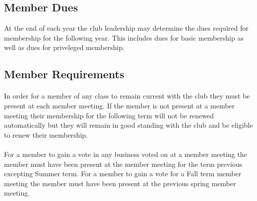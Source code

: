 \documentclass[12pt]{article}
\begin{document}




%
%
\subsection{Member Dues}
At the end of each year the club leadership may determine the dues required for membership for the following year.
This includes dues for basic membership as well as dues for priveleged membership.



\subsection{Member Requirements}
\paragraph{}
In order for a member of any class to remain current with the club they must be present at each member
meeting. If the member is not present at a member meeting their membership for the following term 
will not be renewed automatically but they will remain in good standing with the club and be 
eligible to renew their membership.

\paragraph{}
For a member to gain a vote in any business voted on at a member meeting the member must have been 
present at the member meeting for the term previous excepting Summer term. For a member to gain a 
vote for a Fall term member meeting the member must have been present at the previous spring member
meeting. 
\end{document}
